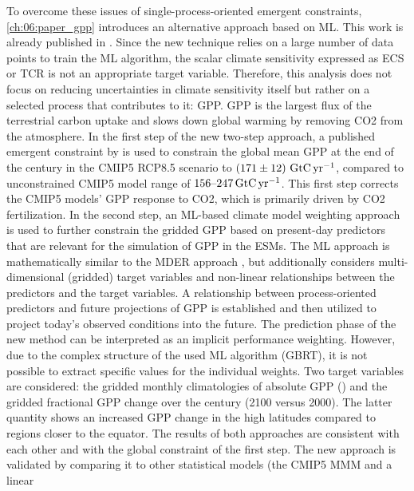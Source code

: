 To overcome these issues of single-process-oriented emergent constraints,
\cref{ch:06:paper_gpp} introduces an alternative approach based on \ac{ML}.
This work is already published in \textcite{Schlund2020}. Since the new
technique relies on a large number of data points to train the \ac{ML}
algorithm, the scalar climate sensitivity expressed as \ac{ECS} or \ac{TCR} is
not an appropriate target variable. Therefore, this analysis does not focus on
reducing uncertainties in climate sensitivity itself but rather on a selected
process that contributes to it: \ac{GPP}. \Ac{GPP} is the largest flux of the
terrestrial carbon uptake and slows down global warming by removing \ac{CO2}
from the atmosphere. In the first step of the new two-step approach, a
published emergent constraint by \textcite{Wenzel2016} is used to constrain the
global mean \ac{GPP} at the end of the  century in the \acs{CMIP}5
\acs{RCP}8.5 scenario to $\pmrangeunit{171}{12}{\GtCyr{}}$, compared to
unconstrained \acs{CMIP}5 model range of $\rangeunit{156}{247}{\GtCyr{}}$. This
first step corrects the \acs{CMIP}5 models' \ac{GPP} response to \ac{CO2},
which is primarily driven by \ac{CO2} fertilization. In the second step, an
\acs{ML}-based climate model weighting approach is used to further constrain
the gridded \ac{GPP} based on present-day predictors that are relevant for the
simulation of \ac{GPP} in the \acp{ESM}. The \ac{ML} approach is mathematically
similar to the \ac{MDER} approach \autocite{Karpechko2013, Senftleben2020,
  Wenzel2016a}, but additionally considers multi-dimensional (gridded) target
variables and non-linear relationships between the predictors and the target
variables. A relationship between process-oriented predictors and future
projections of \ac{GPP} is established and then utilized to project today's
observed conditions into the future. The prediction phase of the new method can
be interpreted as an implicit performance weighting. However, due to the
complex structure of the used \ac{ML} algorithm (\ac{GBRT}), it is not possible
to extract specific values for the individual weights. Two target variables are
considered: the gridded monthly climatologies of absolute \ac{GPP}
() and the gridded fractional \ac{GPP} change over the
 century (2100 versus 2000). The latter quantity shows an increased
\acs{GPP} change in the high latitudes compared to regions closer to the
equator. The results of both approaches are consistent with each other and with
the global constraint of the first step. The new approach is validated by
comparing it to other statistical models (the \acs{CMIP}5 \ac{MMM} and a linear
